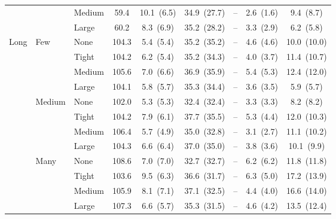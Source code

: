 \begin{table}[htbp]
{\begin{tabular}{lll c ccccc}
 &  & {\small Medium} & 59.4 & 10.1~{\scriptsize(6.5)} & 34.9~{\scriptsize(27.7)} & -- & 2.6~{\scriptsize(1.6)} & 9.4~{\scriptsize(8.7)} \\
 &  & {\small Large} & 60.2 & 8.3~{\scriptsize(6.9)} & 35.2~{\scriptsize(28.2)} & -- & 3.3~{\scriptsize(2.9)} & 6.2~{\scriptsize(5.8)} \\
\midrule
\multirow{12}{*}{\small Long} & \multirow{4}{*}{\small Few} & {\small None} & 104.3 & 5.4~{\scriptsize(5.4)} & 35.2~{\scriptsize(35.2)} & -- & 4.6~{\scriptsize(4.6)} & 10.0~{\scriptsize(10.0)} \\
 &  & {\small Tight} & 104.2 & 6.2~{\scriptsize(5.4)} & 35.2~{\scriptsize(34.3)} & -- & 4.0~{\scriptsize(3.7)} & 11.4~{\scriptsize(10.7)} \\
 &  & {\small Medium} & 105.6 & 7.0~{\scriptsize(6.6)} & 36.9~{\scriptsize(35.9)} & -- & 5.4~{\scriptsize(5.3)} & 12.4~{\scriptsize(12.0)} \\
 &  & {\small Large} & 104.1 & 5.8~{\scriptsize(5.7)} & 35.3~{\scriptsize(34.4)} & -- & 3.6~{\scriptsize(3.5)} & 5.9~{\scriptsize(5.7)} \\
 & \multirow{4}{*}{\small Medium} & {\small None} & 102.0 & 5.3~{\scriptsize(5.3)} & 32.4~{\scriptsize(32.4)} & -- & 3.3~{\scriptsize(3.3)} & 8.2~{\scriptsize(8.2)} \\
 &  & {\small Tight} & 104.2 & 7.9~{\scriptsize(6.1)} & 37.7~{\scriptsize(35.5)} & -- & 5.3~{\scriptsize(4.4)} & 12.0~{\scriptsize(10.3)} \\
 &  & {\small Medium} & 106.4 & 5.7~{\scriptsize(4.9)} & 35.0~{\scriptsize(32.8)} & -- & 3.1~{\scriptsize(2.7)} & 11.1~{\scriptsize(10.2)} \\
 &  & {\small Large} & 104.3 & 6.6~{\scriptsize(6.4)} & 37.0~{\scriptsize(35.0)} & -- & 3.8~{\scriptsize(3.6)} & 10.1~{\scriptsize(9.9)} \\
 & \multirow{4}{*}{\small Many} & {\small None} & 108.6 & 7.0~{\scriptsize(7.0)} & 32.7~{\scriptsize(32.7)} & -- & 6.2~{\scriptsize(6.2)} & 11.8~{\scriptsize(11.8)} \\
 &  & {\small Tight} & 103.6 & 9.5~{\scriptsize(6.3)} & 36.6~{\scriptsize(31.7)} & -- & 6.3~{\scriptsize(5.0)} & 17.2~{\scriptsize(13.9)} \\
 &  & {\small Medium} & 105.9 & 8.1~{\scriptsize(7.1)} & 37.1~{\scriptsize(32.5)} & -- & 4.4~{\scriptsize(4.0)} & 16.6~{\scriptsize(14.0)} \\
 &  & {\small Large} & 107.3 & 6.6~{\scriptsize(5.7)} & 35.3~{\scriptsize(31.5)} & -- & 4.6~{\scriptsize(4.2)} & 13.5~{\scriptsize(12.4)} \\
\bottomrule
\end{tabular}%
}
\end{table}
